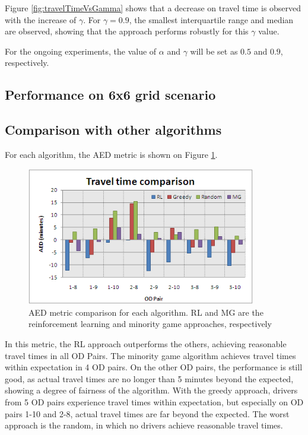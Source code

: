 \documentclass{RITA}
\begin{document}
Figure \ref{fig:travelTimeVsGamma} shows that a decrease on travel time is observed with the increase of $\gamma$. For $\gamma = 0.9$, the smallest interquartile range and median are observed, showing that the approach performs robustly for this $\gamma$ value.

For the ongoing experiments, the value of $\alpha$ and $\gamma$ will be set as $0.5$ and $0.9$, respectively.

\subsection{Performance on 6x6 grid scenario}


\subsection{Comparison with other algorithms}

For each algorithm, the AED metric is shown on Figure \ref{fig:travelTimeComparison}. 

\begin{figure}[ht]
    \centerline{\includegraphics[width=10cm]{img/travelTimeComparison.png}}
    \caption{AED metric comparison for each algorithm. RL and MG are the reinforcement learning and minority game approaches, respectively}
    \label{fig:travelTimeComparison}
\end{figure}

In this metric, the RL approach outperforms the others, achieving reasonable travel times in all OD Pairs. The minority game algorithm achieves travel times within expectation in 4 OD pairs. On the other OD pairs, the performance is still good, as actual travel times are no longer than 5 minutes beyond the expected, showing a degree of fairness of the algorithm. With the greedy approach, drivers from 5 OD pairs experience travel times within expectation, but especially on OD pairs 1-10 and 2-8, actual travel times are far beyond the expected. The worst approach is the random, in which no drivers achieve reasonable travel times.
\end{document}
